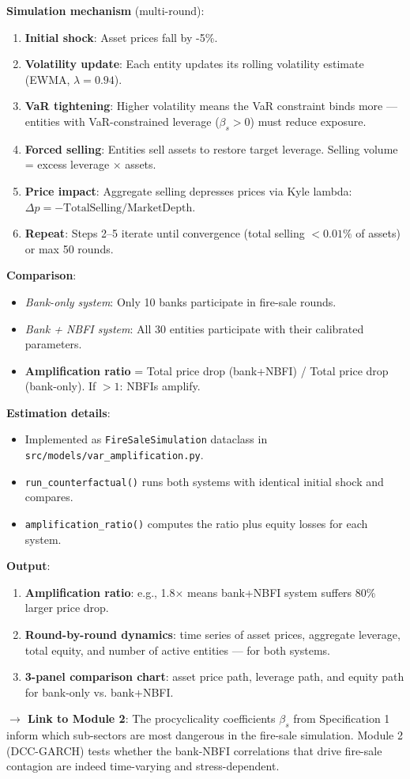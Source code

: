 \documentclass[11pt,a4paper]{article}
\begin{document}
\textbf{Simulation mechanism} (multi-round):
\begin{enumerate}
\item \textbf{Initial shock}: Asset prices fall by -5\%.
\item \textbf{Volatility update}: Each entity updates its rolling volatility estimate (EWMA, $\lambda = 0.94$).
\item \textbf{VaR tightening}: Higher volatility means the VaR constraint binds more --- entities with VaR-constrained leverage ($\beta_s > 0$) must reduce exposure.
\item \textbf{Forced selling}: Entities sell assets to restore target leverage. Selling volume = excess leverage $\times$ assets.
\item \textbf{Price impact}: Aggregate selling depresses prices via Kyle lambda: $\Delta p = -\text{TotalSelling} / \text{MarketDepth}$.
\item \textbf{Repeat}: Steps 2--5 iterate until convergence (total selling $< 0.01\%$ of assets) or max 50 rounds.

\end{enumerate}
\textbf{Comparison}:
\begin{itemize}
\item \textit{Bank-only system}: Only 10 banks participate in fire-sale rounds.
\item \textit{Bank + NBFI system}: All 30 entities participate with their calibrated parameters.
\item \textbf{Amplification ratio} = Total price drop (bank+NBFI) / Total price drop (bank-only). If $> 1$: NBFIs amplify.

\end{itemize}
\textbf{Estimation details}:
\begin{itemize}
\item Implemented as \texttt{FireSaleSimulation} dataclass in \texttt{src/models/var\_amplification.py}.
\item \texttt{run\_counterfactual()} runs both systems with identical initial shock and compares.
\item \texttt{amplification\_ratio()} computes the ratio plus equity losses for each system.

\end{itemize}
\textbf{Output}:
\begin{enumerate}
\item \textbf{Amplification ratio}: e.g., 1.8$\times$ means bank+NBFI system suffers 80\% larger price drop.
\item \textbf{Round-by-round dynamics}: time series of asset prices, aggregate leverage, total equity, and number of active entities --- for both systems.
\item \textbf{3-panel comparison chart}: asset price path, leverage path, and equity path for bank-only vs. bank+NBFI.

\end{enumerate}
\textbf{$\rightarrow$ Link to Module 2}: The procyclicality coefficients $\beta_s$ from Specification 1 inform which sub-sectors are most dangerous in the fire-sale simulation. Module 2 (DCC-GARCH) tests whether the bank-NBFI correlations that drive fire-sale contagion are indeed time-varying and stress-dependent.
\end{document}
